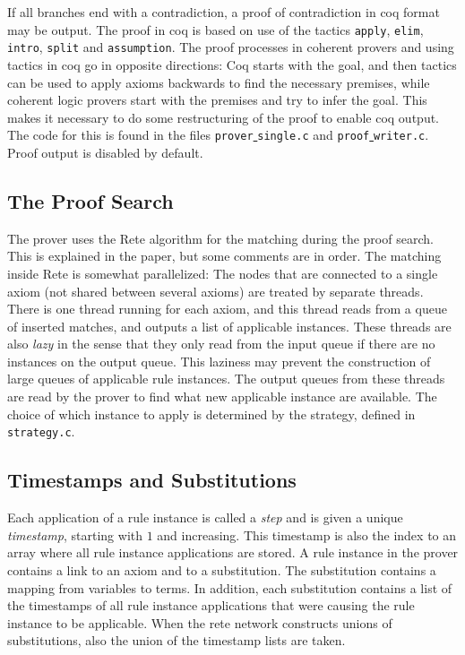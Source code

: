 \documentclass[a4paper]{article}
\begin{document}
If all branches end with a contradiction, a proof of contradiction in coq format may be output. The proof in coq is based on use of the tactics \verb|apply|, \verb|elim|, \verb|intro|, \verb|split| and \verb|assumption|. The proof processes in coherent provers and using tactics in coq go in opposite directions: Coq starts with the goal, and then tactics can be used to apply axioms backwards to find the necessary premises, while coherent logic provers start with the premises and try to infer the goal. This makes it necessary to do some restructuring of the proof to enable coq output. The code for this is found in the files \verb|prover|\underline{ }\verb|single.c| and \verb|proof|\underline{ }\verb|writer.c|. Proof output is disabled by default.

\subsection{The Proof Search}
The prover uses the Rete algorithm for the matching during the proof search. This is explained in the paper, but some comments are in order. The matching inside Rete is somewhat parallelized: The nodes that are connected to a single axiom (not shared between several axioms) are treated by separate threads. There is one thread running for each axiom, and this thread reads from a queue of inserted matches, and outputs a list of applicable instances. These threads are also \emph{lazy} in the sense that they only read from the input queue if there are no instances on the output queue. This laziness may prevent the construction of large queues of applicable rule instances. The output queues from these threads are read by the prover to find what new applicable instance are available. The choice of which instance to apply is determined by the strategy, defined in \verb|strategy.c|.

\subsection{Timestamps and Substitutions}
Each application of a rule instance is called a \emph{step} and is given a unique \emph{timestamp}, starting with $1$ and increasing. This timestamp is also the index to an array where all rule instance applications are stored. 
A rule instance in the prover contains a link to an axiom and to a substitution. The substitution contains a mapping from variables to terms. In addition, each substitution contains a list of the timestamps of all rule instance applications that were causing the rule instance to be applicable. When the rete network constructs unions of substitutions, also the union of the timestamp lists are taken.
\end{document}
